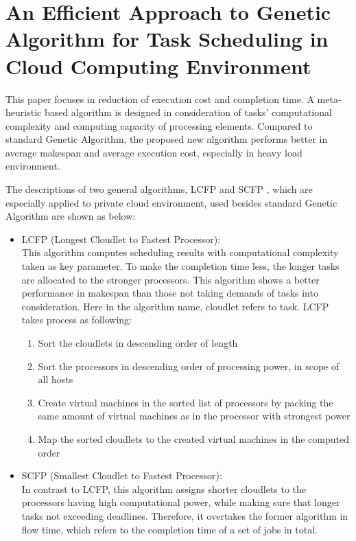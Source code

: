 \documentclass[10pt,twoside,openright,logo]{report}
\begin{document}
\section{An Efficient Approach to Genetic Algorithm for Task Scheduling in Cloud Computing Environment \cite{3}}
This paper focuses in reduction of execution cost and completion time. A meta-heuristic based algorithm is designed in consideration of tasks’ computational complexity and computing capacity of processing elements. Compared to standard Genetic Algorithm, the proposed new algorithm performs better in average makespan and average execution cost, especially in heavy load environment.

The descriptions of two general algorithms, LCFP \cite{4} and SCFP \cite{4}, which are especially applied to private cloud environment, used besides standard Genetic Algorithm are shown as below:
\begin{itemize}
	\item LCFP (Longest Cloudlet to Fastest Processor):\\
	This algorithm computes scheduling results with computational complexity taken as key parameter. To make the completion time less, the longer tasks are allocated to the stronger processors. This algorithm shows a better performance in makespan than those not taking demands of tasks into consideration. 
	Here in the algorithm name, cloudlet refers to task.
	LCFP takes process as following:
	\begin{enumerate}
		\item Sort the cloudlets in descending order of length
		\item Sort the processors in descending order of processing power, in scope of all hosts
		\item Create virtual machines in the sorted list of processors by packing the same amount of virtual machines as in the processor with strongest power
		\item Map the sorted cloudlets to the created virtual machines in the computed order
	\end{enumerate}
	
	\item SCFP (Smallest Cloudlet to Fastest Processor):\\
	In contrast to LCFP, this algorithm assigns shorter cloudlets to the processors having high computational power, while making sure that longer tasks not exceeding deadlines. Therefore, it overtakes the former algorithm in flow time, which refers to the completion time of a set of jobs in total.
\end{itemize}
\end{document}
